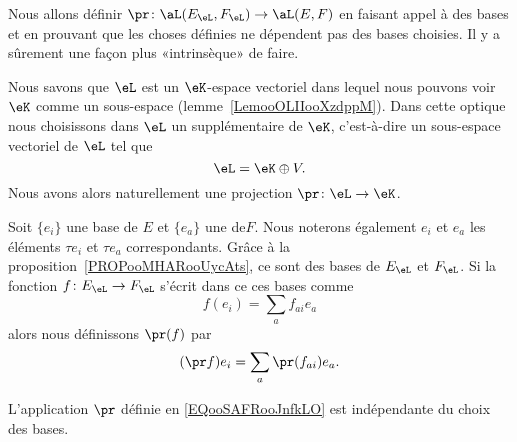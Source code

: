 \begin{probleme}
    Nous allons définir \( \pr\colon \aL(E_{\eL},F_{\eL})\to \aL(E,F)\) en faisant appel à des bases et en prouvant que les choses définies ne dépendent pas des bases choisies. Il y a sûrement une façon plus «intrinsèque» de faire.
\end{probleme}


Nous savons que \( \eL\) est un \( \eK\)-espace vectoriel dans lequel nous pouvons voir \( \eK\) comme un sous-espace (lemme~\ref{LemooOLIIooXzdppM}). Dans cette optique nous choisissons dans \( \eL\) un supplémentaire de \( \eK\), c'est-à-dire un sous-espace vectoriel de \( \eL\) tel que
\begin{equation}
    \eL=\eK\oplus V.
\end{equation}
Nous avons alors naturellement une projection \( \pr\colon \eL\to \eK\).

Soit \( \{ e_i \}\) une base de \( E \) et \(\{ e_a \}\) une  de\( F\). Nous noterons également \( e_i\) et \( e_a\) les éléments \( \tau e_i\) et \( \tau e_a\) correspondants. Grâce à la proposition~\ref{PROPooMHARooUycAts}, ce sont des bases de \( E_{\eL}\) et \( F_{\eL}\). Si la fonction \( f\colon E_{\eL}\to F_{\eL}\) s'écrit dans ce ces bases comme
\begin{equation}
    f(e_i)=\sum_af_{ai}e_a
\end{equation}
alors nous définissons \( \pr(f)\) par
\begin{equation}        \label{EQooSAFRooJnfkLO}
    (\pr f)e_i=\sum_a\pr(f_{ai})e_a.
\end{equation}

\begin{proposition}      \label{PROPooOEHTooHyjuZQ}
    L'application \( \pr\) définie en \eqref{EQooSAFRooJnfkLO} est indépendante du choix des bases.
\end{proposition}

